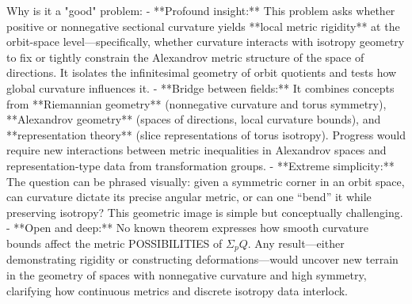 Why is it a "good" problem:  
- **Profound insight:** This problem asks whether positive or nonnegative sectional curvature yields **local metric rigidity** at the orbit-space level—specifically, whether curvature interacts with isotropy geometry to fix or tightly constrain the Alexandrov metric structure of the space of directions. It isolates the infinitesimal geometry of orbit quotients and tests how global curvature influences it.  
- **Bridge between fields:** It combines concepts from **Riemannian geometry** (nonnegative curvature and torus symmetry), **Alexandrov geometry** (spaces of directions, local curvature bounds), and **representation theory** (slice representations of torus isotropy). Progress would require new interactions between metric inequalities in Alexandrov spaces and representation-type data from transformation groups.  
- **Extreme simplicity:** The question can be phrased visually: given a symmetric corner in an orbit space, can curvature dictate its precise angular metric, or can one “bend” it while preserving isotropy? This geometric image is simple but conceptually challenging.  
- **Open and deep:** No known theorem expresses how smooth curvature bounds affect the metric POSSIBILITIES of \(\Sigma_p Q\). Any result—either demonstrating rigidity or constructing deformations—would uncover new terrain in the geometry of spaces with nonnegative curvature and high symmetry, clarifying how continuous metrics and discrete isotropy data interlock.